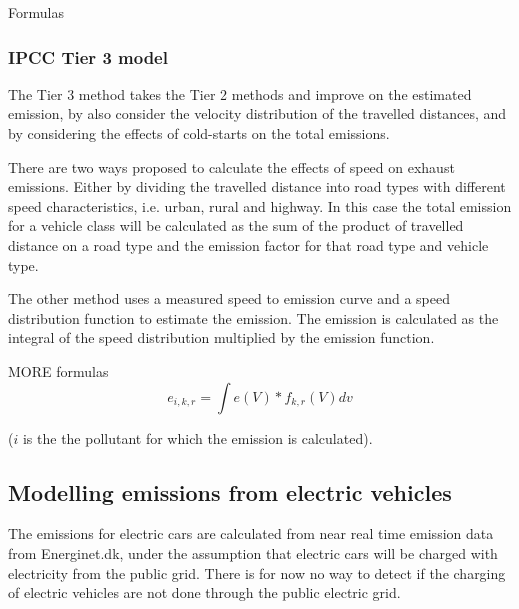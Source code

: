 Formulas

\subsubsection{IPCC Tier 3 model} 
The Tier 3 method takes the Tier 2 methods and improve on the estimated emission, by also consider the velocity distribution of the travelled distances, and by considering the effects of cold-starts on the total emissions.

There are two ways proposed to calculate the effects of speed on exhaust emissions. Either by dividing the travelled distance into road types with different speed characteristics, i.e. urban, rural and highway. In this case the total emission for a vehicle class will be calculated as the sum of the product of travelled distance on a road type and the emission factor for that road type and vehicle type.

The other method uses a measured speed to emission curve and a speed distribution function to estimate the emission. The emission is calculated as the integral of the speed distribution multiplied by the emission function.

MORE formulas
\begin{equation}
e_{i,k,r} = \int{e(V)*f_{k,r}(V)dv}
\end{equation}

($i$ is the the pollutant for which the emission is calculated).


\subsection{Modelling emissions from electric vehicles}
The emissions for electric cars are calculated from near real time emission data from Energinet.dk, under the assumption that electric cars will be charged with electricity from the public grid. There is for now no way to detect if the charging of electric vehicles are not done through the public electric grid.
